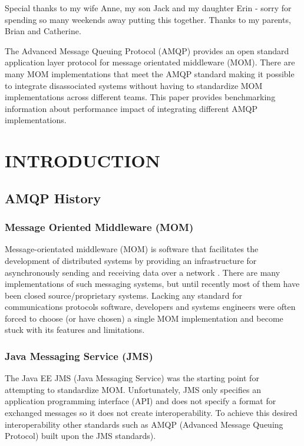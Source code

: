\documentclass{thesis}
\author{David Joe Wade}
\begin{document}
 
\listoftodos
{}
\titlepage             %
\tableofcontents       %
\listoftables          %
\listoffigures         %

Special thanks to my wife Anne, my son Jack and my daughter Erin - sorry for spending so many weekends away putting this together.  Thanks to my parents, Brian and Catherine.

The Advanced Message Queuing Protocol (AMQP) provides an open standard application layer protocol for message orientated middleware (MOM).  There are many MOM implementations that meet the AMQP standard making it possible to integrate disassociated systems without having to standardize MOM implementations across different teams.    This paper provides benchmarking information about performance impact of integrating different AMQP implementations.  


\chapter{INTRODUCTION}
\section{AMQP History}
\subsection{Message Oriented Middleware (MOM)}
Message-orientated middleware (MOM) is software that facilitates the development of distributed systems by providing an infrastructure for asynchronously sending and receiving data over a network \cite{todo}.   There are many implementations of such messaging systems, but until recently most of them have been closed source/proprietary systems.  Lacking any standard for communications protocols software, developers and systems engineers were often forced to choose (or have chosen) a single MOM implementation and become stuck with its features and limitations.  


\subsection{Java Messaging Service (JMS)}
The Java EE JMS (Java Messaging Service) was the starting point for attempting to standardize MOM. Unfortunately, JMS only specifies an application programming interface (API) and does not specify a format for exchanged messages so it does not create interoperability.   To achieve this desired interoperability other standards such as AMQP (Advanced Message Queuing Protocol) built upon the JMS standards).  
\end{document}
